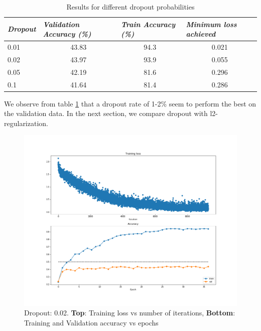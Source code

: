 \documentclass[12pt,twoside]{article}
\begin{document}
\begin{table}[!htbp]
\centering
\begin{tabular}{|l|c|c|c|}
\hline
\textit{\textbf{Dropout}} & \multicolumn{1}{l|}{\textit{\textbf{Validation Accuracy (\%)}}} & \multicolumn{1}{l|}{\textit{\textbf{Train Accuracy (\%)}}} & \multicolumn{1}{l|}{\textit{\textbf{Minimum loss achieved}}} \\ \hline
0.01                      & 43.83                                                           & 94.3                                                       & 0.021                                                        \\ \hline
0.02                      & 43.97                                                           & 93.9                                                       & 0.055                                                        \\ \hline
0.05                      & 42.19                                                           & 81.6                                                       & 0.296                                                        \\ \hline
0.1                       & 41.64                                                           & 81.4                                                       & 0.286                                                        \\ \hline
\end{tabular}
\caption{Results for different dropout probabilities}
\label{dropout}
\end{table}

We observe from table \ref{dropout} that a dropout rate of 1-2\% seem to perform the best on the validation data. In the next section, we compare dropout with l2-regularization.

\begin{figure}[!htbp]
\centering %
\includegraphics[width = 0.8\hsize]{./figures/drop_0_01.png} %
\caption{Dropout: 0.02. \textbf{Top}: Training loss vs number of iterations, \textbf{Bottom}: Training and Validation accuracy vs epochs} %
\label{dropout0_01}
\end{figure}
\end{document}
